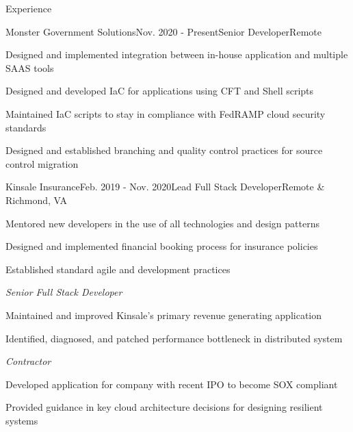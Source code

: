 \documentclass{resume} %
\begin{document}

\begin{rSection}{Experience}

	\begin{rSubsection}{Monster Government Solutions}{Nov. 2020 - Present}{\vspace{-0.5em}Senior Developer}{Remote}
		\item Designed and implemented integration between in-house application and multiple SAAS tools
		\item Designed and developed IaC for applications using CFT and Shell scripts
		\item Maintained IaC scripts to stay in compliance with FedRAMP cloud security standards
		\item Designed and established branching and quality control practices for source control migration
	\end{rSubsection}

	\begin{rSubsection}{Kinsale Insurance}{Feb. 2019 - Nov. 2020}{\vspace{-0.5em}Lead Full Stack Developer}{Remote \& Richmond, VA}
			\item Mentored new developers in the use of all technologies and design patterns
			\item Designed and implemented financial booking process for insurance policies
			\item Established standard agile and development practices

	    \vspace{-0.5em}\setlength{\itemindent}{.0in}\emph{Senior Full Stack Developer}
	    	\item Maintained and improved Kinsale's primary revenue generating application
			\item Identified, diagnosed, and patched performance bottleneck in distributed system

		\vspace{-0.5em}\setlength{\itemindent}{.0in}\emph{Contractor}
			\item Developed application for company with recent IPO to become SOX compliant
			\item Provided guidance in key cloud architecture decisions for designing resilient systems



\end{rSubsection}
\end{rSection}
\end{document}
